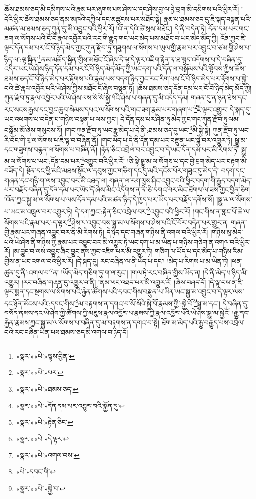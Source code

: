 ཆོས་ཐམས་ཅད་མི་དམིགས་པའི་རྣམ་པར་ཞུགས་པས་ཤེས་པ་དང་ཤེས་བྱ་ལ་བྱེ་བྲག་མི་དམིགས་པའི་ཕྱིར་རོ། །དེའི་ཕྱིར་ཆོས་ཐམས་ཅད་ནམ་མཁའི་དཀྱིལ་དང་མཚུངས་པར་མཐོང་སྟེ། རྣམ་པ་ཐམས་ཅད་དུ་ཇི་སྐད་བསྟན་པའི་མཚན་མ་ཐམས་ཅད་ཀུན་དུ་མི་འབྱུང་བའི་ཕྱིར་རོ། །འོ་ན་དེའི་ཚེ་སུས་མཐོང་། དེ་ནི་བདེན་ཏེ། དོན་དམ་པར་གང་ཟག་ལ་སོགས་པའི་ངོ་བོ་རྣལ་འབྱོར་པའི་རང་གི་རྒྱུད་གང་ཡང་མེད་པས་མཐོང་བ་ཡང་མེད་མོད་ཀྱི། འོན་ཀྱང་ཇི་ལྟར་དོན་དམ་པར་ངོ་བོ་ཉིད་མེད་ཀྱང་ཀུན་རྫོབ་ཏུ་གཟུགས་ལ་སོགས་པ་ཡུལ་གྱི་རྣམ་པར་འབྱུང་བ་ཙམ་གྱི་ཤེས་པ་ཉིད་ལ་:ལྷ་སྦྱིན་\footnote{«སྣར་»«པེ་»ལྷས་བྱིན་}ནམ་མཆོད་སྦྱིན་གྱིས་མཐོང་ངོ་ཞེས་དེ་ལྟ་དེ་ལྟར་འཇིག་རྟེན་ན་ཐ་སྙད་འདོགས་པ་དེ་བཞིན་དུ་འདིར་ཡང་ཡེ་ཤེས་ཉིད་དོན་དམ་པར་ངོ་བོ་ཉིད་མེད་མོད་ཀྱི་ཡང་དག་པའི་དོན་ལ་བསྒོམས་པའི་སྟོབས་ཀྱིས་ཆོས་ཐམས་ཅད་ངོ་བོ་ཉིད་མེད་པར་རྟོགས་པའི་རྣམ་པས་བདག་ཉིད་ཀྱང་རང་རིག་པས་ངོ་བོ་ཉིད་མེད་པར་རྟོགས་པ་སྐྱེ་བའི་ཚེ་རྣལ་འབྱོར་པའི་ཡེ་ཤེས་ཀྱིས་མཐོང་ངོ་ཞེས་བསྟན་ཏོ། །ཆོས་ཐམས་ཅད་དོན་དམ་པར་ངོ་བོ་ཉིད་མེད་མོད་ཀྱི། ཀུན་རྫོབ་ཏུ་རྣལ་འབྱོར་པའི་ཡེ་ཤེས་ལས་སོ་སོ་སྐྱེ་བོའི་ཤེས་པ་གཞན་དུ་མི་འདོད་དམ། གཞན་དུ་ན་ཉན་ཐོས་དང་རང་སངས་རྒྱས་དང་བྱང་ཆུབ་སེམས་དཔའ་ལ་སོགས་པའི་གང་ཟག་རྣམ་པར་གཞག་པ་\footnote{«སྣར་»«པེ་»པར་}ཇི་ལྟར་འགྱུར། དེ་སྐད་དུ་ཡང་འཕགས་པ་བདེན་པ་གཉིས་བསྟན་པ་ལས་ཀྱང་། དེ་དོན་དམ་པར་ཤིན་ཏུ་མེད་ཀྱང་གང་ཀུན་རྫོབ་ཏུ་ལམ་བསྒོམ་མོ་ཞེས་གསུངས་སོ། །གང་ཀུན་རྫོབ་ཏུ་ཡང་རྒྱུ་མེད་པ་དེ་ནི་:ཐམས་ཅད་དུ་ཡང་\footnote{«སྣར་»«པེ་»ཐམས་ཅད་}མི་སྐྱེ་སྟེ། ཀུན་རྫོབ་ཏུ་ཡང་རི་བོང་གི་རྭ་ལ་སོགས་པ་ཇི་ལྟ་བ་བཞིན་ནོ། །གང་ཡོད་པ་དེ་ནི་དོན་དམ་པར་བརྫུན་ཡང་སྐྱེ་བར་འགྱུར་ཏེ། སྒྱུ་མ་དང་གཟུགས་བརྙན་ལ་སོགས་པ་བཞིན་ནོ། །རྟེན་ཅིང་འབྲེལ་བར་འབྱུང་བ་དེ་ཡང་དོན་དམ་པར་མི་རིགས་ཏེ། སྒྱུ་མ་ལ་སོགས་པ་ཡང་:དོན་དམ་པར་\footnote{«སྣར་»«པེ་»དོན་དམ་པར་འགྱུར་བའི་སྐྱོན་དུ་}འགྱུར་བའི་ཕྱིར་རོ། །ཅི་སྟེ་སྒྱུ་མ་ལ་སོགས་པ་དང་བྱེ་བྲག་མེད་པར་བརྟག་མི་བཟོད་དེ། སྔོན་དང་ཕྱི་མའི་མཐས་སྟོང་ལ་དབུས་ཀྱང་གཅིག་དང་དུ་མའི་དངོས་པོར་གཟུང་དུ་མེད་དེ། བདག་དང་གཞན་དང་གཉི་ག་ལས་འབྱུང་བར་མི་འཐད་ལ། གཞན་ལ་རག་ལུས་ཤིང་འབྱུང་བའི་ཕྱིར་བདག་གི་རྒྱུད་བདག་མེད་པར་བརྗོད་བཞིན་དུ་དོན་དམ་པར་ཡོད་དོ་ཞེས་མིང་འདོགས་ན་ནི་ཅི་དགའ་བར་མིང་ཐོགས་ལ་ཟས་ཀྱང་བྱིན་ཅིག །འོན་ཀྱང་སྒྱུ་མ་ལ་སོགས་པ་ལས་དོན་དམ་པའི་མཚན་ཉིད་དེ་ཁྱད་པར་ཡོད་པར་བརྗོད་དགོས་སོ། །སྒྱུ་མ་ལ་སོགས་པ་ཡང་མ་འཁྲུལ་བར་འགྱུར་ཏེ། དེ་དག་ཀྱང་:རྟེན་ཅིང་འབྲེལ་བར་\footnote{«སྣར་»«པེ་»རྟེན་ཅིང་}འབྱུང་བའི་ཕྱིར་རོ། །གང་གིས་ན་གླང་པོ་ཆེ་ལ་སོགས་པའི་རྣམ་པར་:ད་ལྟར་\footnote{«སྣར་»«པེ་»དེ་ལྟར་}ཤེས་པ་འབྱུང་བས་སྒྱུ་མ་ལ་སོགས་པ་ཤེས་པའི་ངོ་བོར་བདེན་པར་གྱུར་ན། གཞན་གྱི་རྣམ་པར་གཞན་འབྱུང་བར་ནི་མི་རིགས་ཏེ། དེ་ཉིད་དང་གཞན་གཉིས་ནི་འགལ་བའི་ཕྱིར་རོ། །གཉིས་སུ་མེད་པའི་ཡེ་ཤེས་ནི་གཉིས་ཀྱི་རྣམ་པར་འབྱུང་བར་མི་འགྱུར་ཏེ་ཡང་དག་པ་མ་ཡིན་པ་གཉིས་གཅིག་ན་འགལ་བའི་ཕྱིར་རོ། །མ་བྱུང་བ་ལས་འབྱུང་ཞིང་བྱུང་ནས་ཀྱང་འཇིག་པར་མི་འགྱུར་ཏེ། གཅིག་ལ་ཡོད་པ་དང་མེད་པ་གཉིས་རིམ་གྱིས་ན་ཡང་འགལ་བའི་ཕྱིར་རོ། །དེ་སྐད་དུ། རང་བཞིན་ལ་ནི་ཡོད་པ་དང་། །མེད་པ་རིགས་པ་མ་ཡིན་ཏེ། །ཕན་ཚུན་དུ་ནི་:འགལ་བ་\footnote{«སྣར་»«པེ་»འགལ་བས་}ན། །ཡོད་མེད་གཅིག་ཏུ་ག་ལ་རུང་། །གལ་ཏེ་རང་བཞིན་གྱིས་ཡོད་ན། །དེ་ནི་མེད་པ་ཉིད་མི་འགྱུར། །རང་བཞིན་གཞན་དུ་འགྱུར་བ་ནི། །ནམ་ཡང་འཐད་པར་མི་འགྱུར་རོ། །ཞེས་བཤད་དོ། །དེ་ལྟ་བས་ན་ཇི་ལྟར་སྨན་དང་སྔགས་ལ་སོགས་པའི་རྐྱེན་ཚོགས་པའི་དབང་གིས་བརྫུན་པ་ཡིན་ཡང་སྒྱུ་མ་འབྱུང་བ་དེ་ལྟར་ལས་དང་ཉོན་མོངས་པའི་:དབང་གིས་\footnote{«པེ་»དབང་གི་}མ་བརྟགས་ན་དགའ་བ་སོ་སོའི་སྐྱེ་བོ་རྣམས་ཀྱི་:སྐྱེ་བོ་\footnote{«སྣར་»«པེ་»སྐྱེ་བ་}སྒྱུ་མ་དང་། དེ་བཞིན་དུ་བསོད་ནམས་དང་ཡེ་ཤེས་ཀྱི་ཚོགས་ཀྱི་མཐུས་རྣལ་འབྱོར་པ་རྣམས་ཀྱི་རྣལ་འབྱོར་པའི་ཡེ་ཤེས་སྒྱུ་མ་སྐྱེའོ། །རྒྱུ་དང་རྐྱེན་རྣམས་ཀྱང་སྒྱུ་མ་ལ་སོགས་པ་བཞིན་དུ་མ་བརྟགས་ན་དགའ་བ་སྟེ། ཐོག་མ་མེད་པའི་རྒྱུ་བརྒྱུད་པས་འབྲེལ་བའི་རང་བཞིན་ཡིན་པས་ཐམས་ཅད་མི་འགལ་བ་ཉིད་དོ། 
